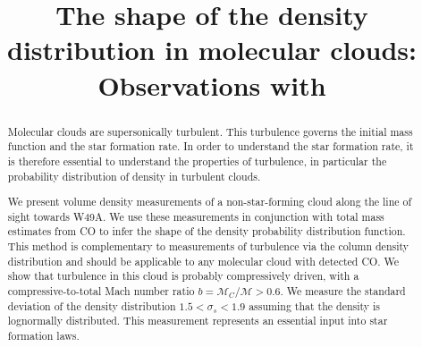 \title{The shape of the density distribution in molecular clouds: Observations with
\formaldehyde}
\begin{abstract}
    Molecular clouds are supersonically turbulent.  This turbulence governs
    the initial mass function and the star formation rate.  In order to
    understand the star formation rate, it is therefore essential to understand
    the properties of turbulence, in particular the probability distribution of
    density in turbulent clouds.

    We present \formaldehyde volume density measurements of a non-star-forming
    cloud along the line of sight towards W49A. We use these measurements in
    conjunction with total mass estimates from CO to infer the shape of the
    density probability distribution function.  This method is complementary to
    measurements of turbulence via the column density distribution and should
    be applicable to any molecular cloud with detected CO.  We show that
    turbulence in this cloud is probably compressively driven, with a
    compressive-to-total Mach number ratio $b = \mathcal{M}_C/\mathcal{M}>0.6$.  
    We measure the standard deviation of the density distribution $1.5 < \sigma_s < 1.9$
    assuming that the density is lognormally distributed.  This measurement
    represents an essential input into star formation laws.



\end{abstract}
